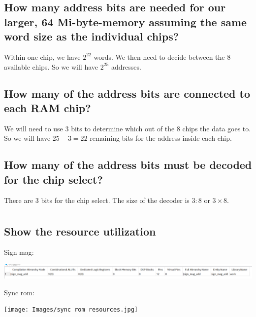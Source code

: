 \documentclass[12pt]{article}
\newenvironment{subquestion}[1]{\subsection{#1}
\begin{tcolorbox}[colback=blue!2!white,colframe=blue!20!white]}{\end{tcolorbox}}
\begin{document}
        \begin{subquestion}{How many address bits are needed for our larger, 64 Mi-byte-memory assuming the same word size as the individual chips?}
            Within one chip, we have $2^{22}$ words. We then need to decide between the 8 available chips. So we will have $2^{25}$ addresses. \\

        \end{subquestion}

        \begin{subquestion}{How many of the address bits are connected to each RAM chip?}
            We will need to use 3 bits to determine which out of the 8 chips the data goes to. So we will have $25-3 = 22$ remaining bits for the address inside each chip.
        \end{subquestion}

        \begin{subquestion}{How many of the address bits must be decoded for the chip select?}
            There are 3 bits for the chip select. The size of the decoder is $3:8$ or $3 \times 8$.
        \end{subquestion}

    \section{}
        \begin{subquestion}{Show the resource utilization}
            Sign mag:
            \begin{center}
                \includegraphics[scale = 0.5]{Images/resource 1.png}
            \end{center}
            Sync rom:
            \begin{center}
                \texttt{[image: Images/sync rom resources.jpg]}
            \end{center}
        \end{subquestion}
\end{document}
